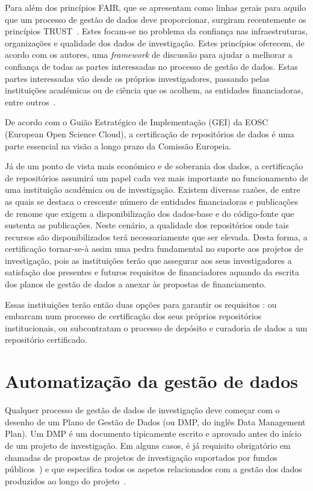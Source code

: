 \documentclass[sigconf,nonacm]{acmart}
\begin{document}
Para além dos princípios FAIR, que se apresentam como linhas gerais para aquilo que um processo de gestão de dados deve proporcionar, surgiram recentemente os princípios TRUST~\cite{TRUSTprinciples}. Estes focam-se no problema da confiança nas infraestruturas, organizações e qualidade dos dados de investigação. Estes princípios oferecem, de acordo com os autores, uma \emph{framework} de discussão para ajudar a melhorar a confiança de todas as partes interessadas no processo de gestão de dados. Estas partes interessadas vão desde os próprios investigadores, passando pelas instituições académicas ou de ciência que os acolhem, as entidades financiadoras, entre outros~\cite{DCC_stakeholders}. 

De acordo com o Guião Estratégico de Implementação (GEI) da EOSC (European Open Science Cloud), a certificação de repositórios de dados é uma parte essencial na visão a longo prazo da Comissão Europeia. 

Já de um ponto de vista mais económico e de soberania dos dados, a certificação de repositórios assumirá um papel cada vez mais importante no funcionamento de uma instituição académica ou de investigação. Existem diversas razões, de entre as quais se destaca o crescente número de entidades financiadoras e publicações de renome que exigem a disponibilização dos dados-base e do código-fonte que sustenta as publicações. Neste cenário, a qualidade dos repositórios onde tais recursos são disponibilizados terá necessariamente que ser elevada. Desta forma, a certificação tornar-se-à assim uma pedra fundamental no suporte aos projetos de investigação, pois as instituições terão que assegurar aos seus investigadores a satisfação dos presentes e futuros requisitos de financiadores aquando da escrita dos planos de gestão de dados a anexar às propostas de financiamento.

Essas instituições terão então duas opções para garantir os requisitos : ou embarcam num processo de certificação dos seus próprios repositórios institucionais, ou subcontratam o processo de depósito e curadoria de dados a um repositório certificado. 

\section{Automatização da gestão de dados}

Qualquer processo de gestão de dados de investigação deve começar com o desenho de um Plano de Gestão de Dados (ou DMP, do inglês Data Management Plan). Um DMP é um documento tipicamente escrito e aprovado antes do início de um projeto de investigação. Em alguns casos, é já requisito obrigatório em chamadas de propostas de projetos de investigação suportados por fundos públicos~\cite{Foundation2011}) e que especifica todos os aspetos relacionados com a gestão dos dados produzidos ao longo do projeto~\cite{}.  
\end{document}

